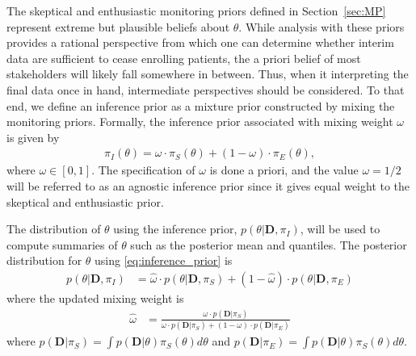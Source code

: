 \documentclass[12pt]{article}
\begin{document}
The skeptical and enthusiastic monitoring priors defined in Section~\ref{sec:MP} represent extreme but plausible beliefs about $\theta$.
%
While analysis with these priors provides a rational perspective from which one can determine whether interim data are sufficient 
to cease enrolling patients, the a priori belief of most stakeholders will likely fall somewhere in between.
%
Thus, when it interpreting the final data once in hand, intermediate perspectives should be considered.
%
To that end, we define an inference prior as a mixture prior constructed by mixing the monitoring priors.
%
Formally, the inference prior associated with mixing weight $\omega$ is given by
\begin{align}\label{eq:inference_prior}
\pi_{I}\left(\theta\right)=\omega\cdot\pi_{S}\left(\theta\right)+(1-\omega) \cdot \pi_E\left(\theta\right),
\end{align}
where $\omega\in[0,1]$. 
%
The specification of $\omega$ is done a priori, and the value $\omega=1/2$ will be referred to as an agnostic inference prior since it gives equal weight to the skeptical and enthusiastic prior.
%

The distribution of $\theta$ using the inference 
prior, $p(\theta|\mathbf{D},\pi_I)$, will be used to compute summaries of $\theta$ such as the posterior mean and quantiles. The posterior distribution for $\theta$ using \eqref{eq:inference_prior} is
\begin{align}
p(\theta|\mathbf{D},\pi_I)&=\hat{\omega}\cdot p(\theta|\mathbf{D},\pi_S)+(1-\hat{\omega})\cdot p(\theta|\mathbf{D},\pi_E)
\end{align}
where the updated mixing weight is
\begin{align}
\hat{\omega}&=\frac{\omega\cdot p(\mathbf{D}|\pi_S)}{\omega\cdot p(\mathbf{D}|\pi_S)+(1-\omega)\cdot p(\mathbf{D}|\pi_E)}
\end{align}
where $p(\mathbf{D}|\pi_S)=\int p(\mathbf{D}|\theta)\pi_S(\theta)d\theta$ and $p(\mathbf{D}|\pi_E)=\int p(\mathbf{D}|\theta)\pi_S(\theta)d\theta$. 
\end{document}

